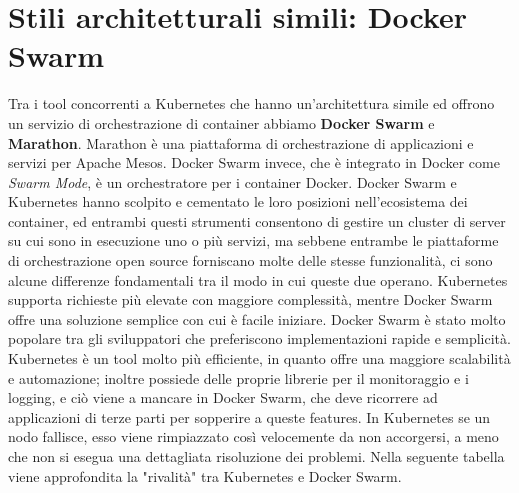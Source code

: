 \documentclass[12pt, a4paper]{report}
\begin{document}
\chapter{Stili architetturali simili: Docker Swarm}
Tra i tool concorrenti a Kubernetes che hanno un'architettura simile ed offrono un servizio di orchestrazione di container abbiamo \textbf{Docker Swarm} e \textbf{Marathon}. Marathon è una piattaforma di orchestrazione di applicazioni e servizi per Apache Mesos.
Docker Swarm invece, che è integrato in Docker come \textit{Swarm Mode}, è un orchestratore per i container Docker. Docker Swarm e Kubernetes hanno scolpito e cementato le loro posizioni nell'ecosistema dei container, ed entrambi questi strumenti consentono di gestire un cluster di server su cui sono in esecuzione uno o più servizi, ma sebbene entrambe le piattaforme di orchestrazione open source forniscano molte delle stesse funzionalità, ci sono alcune differenze fondamentali tra il modo in cui queste due operano. Kubernetes supporta richieste più elevate con maggiore complessità, mentre Docker Swarm offre una soluzione semplice con cui è facile iniziare. Docker Swarm è stato molto popolare tra gli sviluppatori che preferiscono implementazioni rapide e semplicità.
Kubernetes è un tool molto più efficiente, in quanto offre una maggiore scalabilità e automazione; inoltre possiede delle proprie librerie per il monitoraggio e i logging, e ciò viene a mancare in Docker Swarm, che deve ricorrere ad applicazioni di terze parti per sopperire a queste features.
In Kubernetes se un nodo fallisce, esso viene rimpiazzato così velocemente da non accorgersi, a meno che non si esegua una dettagliata risoluzione dei problemi. Nella seguente tabella viene approfondita la "rivalità" tra Kubernetes e Docker Swarm.
\end{document}
